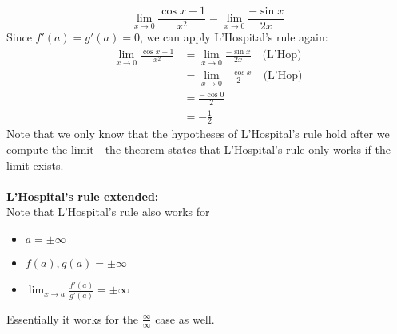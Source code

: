 \documentclass{report}
\begin{document}
\begin{equation*}
\lim_{x\to0}\frac{\cos x-1}{x^2}=\lim_{x\to0}\frac{-\sin x}{2x}
\end{equation*}
Since $f'(a)=g'(a)=0$, we can apply L'Hospital's rule again:
\begin{align*}
\lim_{x\to0}\frac{\cos x-1}{x^2}
&=\lim_{x\to0}\frac{-\sin x}{2x}\quad\text{(L'Hop)}\\
&=\lim_{x\to0}\frac{-\cos x}{2}\quad\text{(L'Hop)}\\
&=\frac{-\cos0}{2}\\
&=-\frac{1}{2}
\end{align*}
Note that we only know that the hypotheses of L'Hospital's rule hold after we compute the 
limit---the theorem states that L'Hospital's rule only works if the limit exists.\\
\vspace{1mm}\\
\textbf{L'Hospital's rule extended:}\\
Note that L'Hospital's rule also works for
\begin{itemize}
\item $a=\pm\infty$
\item $f(a),g(a)=\pm\infty$
\item $\lim_{x\to a}\frac{f'(a)}{g'(a)}=\pm\infty$
\end{itemize}
Essentially it works for the $\frac{\infty}{\infty}$ case as well.
\newpage
\end{document}
